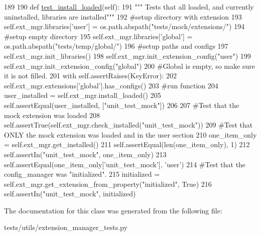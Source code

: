 \begin{DoxyCode}
189 
190     \textcolor{keyword}{def }\hyperlink{classtests_1_1utils_1_1extension__manager__tests_1_1ExtensionLibraries_a73dd723752e59cf02a86230335645e52}{test\_install\_loaded}(self):
191         \textcolor{stringliteral}{""" Tests that all loaded, and currently uninstalled, libraries are installed"""}
192         \textcolor{comment}{#setup directory with extension}
193         self.ext\_mgr.libraries[\textcolor{stringliteral}{'user'}] = os.path.abspath(\textcolor{stringliteral}{"tests/mock/extensions/"})
194         \textcolor{comment}{#setup empty directory}
195         self.ext\_mgr.libraries[\textcolor{stringliteral}{'global'}] = os.path.abspath(\textcolor{stringliteral}{"tests/temp/global/"})
196         \textcolor{comment}{#setup paths and configs}
197         self.ext\_mgr.init\_libraries()
198         self.ext\_mgr.init\_extension\_config(\textcolor{stringliteral}{"user"})
199         self.ext\_mgr.init\_extension\_config(\textcolor{stringliteral}{"global"})
200         \textcolor{comment}{#Global is empty, so make sure it is not filled.}
201         with self.assertRaises(KeyError):
202             self.ext\_mgr.extensions[\textcolor{stringliteral}{'global'}].has\_configs()
203         \textcolor{comment}{#run function}
204         user\_installed = self.ext\_mgr.install\_loaded()
205         self.assertEqual(user\_installed, [\textcolor{stringliteral}{"unit\_test\_mock"}])
206 
207         \textcolor{comment}{#Test that the mock extension was loaded}
208         self.assertTrue(self.ext\_mgr.check\_installed(\textcolor{stringliteral}{"unit\_test\_mock"}))
209         \textcolor{comment}{#Test that ONLY the mock extension was loaded and in the user section}
210         one\_item\_only = self.ext\_mgr.get\_installed()
211         self.assertEqual(len(one\_item\_only), 1)
212         self.assertIn(\textcolor{stringliteral}{"unit\_test\_mock"}, one\_item\_only)
213         self.assertEqual(one\_item\_only[\textcolor{stringliteral}{'unit\_test\_mock'}], \textcolor{stringliteral}{'user'})
214         \textcolor{comment}{#Test that the config\_manager was "initialized".}
215         initialized = self.ext\_mgr.get\_extension\_from\_property(\textcolor{stringliteral}{"initialized"}, \textcolor{keyword}{True})
216         self.assertIn(\textcolor{stringliteral}{"unit\_test\_mock"}, initialized)

\end{DoxyCode}


The documentation for this class was generated from the following file\-:\begin{DoxyCompactItemize}
\item 
tests/utils/extension\-\_\-manager\-\_\-tests.\-py\end{DoxyCompactItemize}
